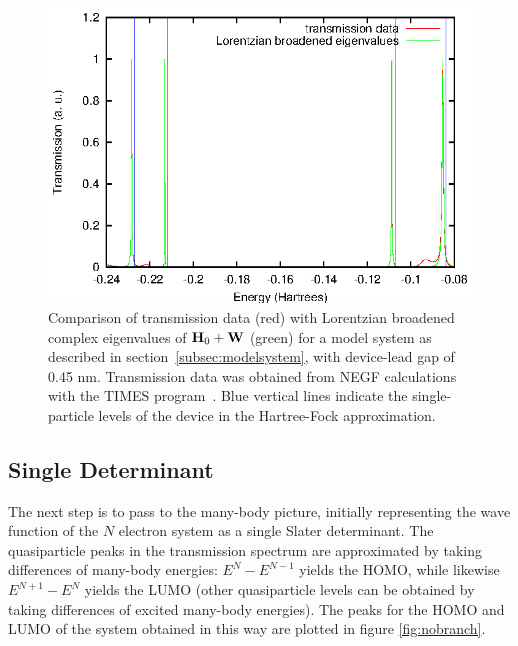 \begin{figure}
	\begin{center}
		\includegraphics[width=0.9\linewidth]{figures/4evals}
	\end{center}
	\caption{Comparison of transmission data (red) with Lorentzian
	broadened complex eigenvalues of $\mathbf{H}_0 + \mathbf{W}$ (green) for a
	model system as described in section~\ref{subsec:modelsystem}, with
	device-lead gap of 0.45 nm. Transmission data was obtained from
	\ac{NEGF} calculations with the TIMES program~\cite{times}.
        Blue vertical lines indicate the single-particle levels of the device
        in the Hartree-Fock approximation.}
	\label{fig:lobro-hwevals}
\end{figure}

\subsection{Single Determinant}
\label{subsec:SingleDeterminant}

The next step is to pass to the many-body picture, initially representing the
wave function of the $N$ electron system as a single Slater determinant. The
quasiparticle peaks in the transmission spectrum are approximated by taking
differences of many-body energies: $E^N - E^{N-1}$ yields the \ac{HOMO}, while
likewise $E^{N+1} - E^N$ yields the \ac{LUMO} (other quasiparticle levels can be
obtained by taking differences of excited many-body energies). The peaks for
the \ac{HOMO} and \ac{LUMO} of the system obtained in this way are plotted in figure
\ref{fig:nobranch}.

